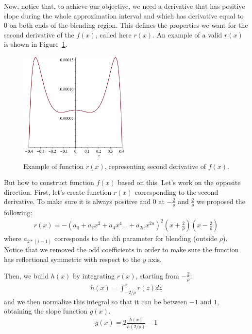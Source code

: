 \documentclass[11pt]{article}
\begin{document}
Now, notice that, to achieve our objective, we need a derivative that has positive slope during the whole approximation interval and which has derivative equal to $0$ on both ends of the blending region. This defines the properties we want for the second derivative of the $f(x)$, called here $r(x)$. An example of a valid $r(x)$ is shown in Figure~\ref{fig:positive_function}.
  \begin{figure}[!hbt]
    \begin{center}
      \includegraphics[width=0.5\textwidth]{positive_function}
    \end{center}
    \caption{Example of function $r(x)$, representing second derivative of $f(x)$.}
    \label{fig:positive_function}
  \end{figure}
  
But how to construct function $f(x)$ based on this. Let's work on the opposite direction. First, let's create function $r(x)$ corresponding to the second derivative. To make sure it is always positive and $0$ at $-\frac2\rho$ and $\frac2\rho$ we proposed the following:
\begin{align}
  r(x) = -\left(a_0 + a_2 x^2 + a_4 x^4 \dots + a_{2n} x^{2n}  \right)^2 \left(x + \frac2\rho\right) \left(x - \frac2\rho\right)
\end{align}
where $a_{2*(i-1)}$ corresponds to the $i$th parameter for blending (outside $\rho$). Notice that we removed the odd coefficients in order to make sure the function has reflectional symmetric with respect to the $y$ axis.

Then, we build $h(x)$ by integrating $r(x)$, starting from $-\frac{2}\rho$:
\begin{align*}
  h(x) = \int_{-2/\rho}^{x} r(z) dz
\end{align*}
and we then normalize this integral so that it can be between $-1$ and $1$, obtaining the slope function $g(x)$.
\begin{align*}
  g(x) = 2 \frac{h(x)}{h(2/\rho)} - 1
\end{align*}
  
\end{document}
